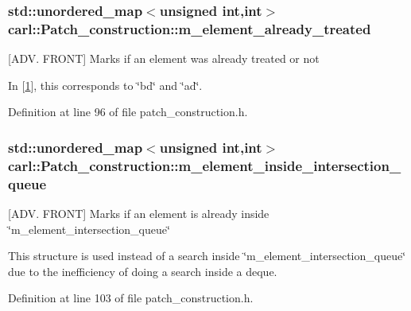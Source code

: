 \subsubsection[{m\+\_\+element\+\_\+already\+\_\+treated}]{\setlength{\rightskip}{0pt plus 5cm}std\+::unordered\+\_\+map$<$unsigned int,int$>$ carl\+::\+Patch\+\_\+construction\+::m\+\_\+element\+\_\+already\+\_\+treated\hspace{0.3cm}{\ttfamily [protected]}}\label{classcarl_1_1_patch__construction_a11aed0d9b1e61d152d02cf56e1690c53}


\mbox{[}A\+D\+V. F\+R\+O\+N\+T\mbox{]} Marks if an element was already treated or not 

In \mbox{[}\hyperlink{classcarl_1_1_patch__construction_Gander_article}{1}\mbox{]}, this corresponds to \char`\"{}bd\char`\"{} and \char`\"{}ad\char`\"{}. 

Definition at line 96 of file patch\+\_\+construction.\+h.

\hypertarget{classcarl_1_1_patch__construction_a66d5ff525192d6aa53ea63beb95afd7d}{}
\subsubsection[{m\+\_\+element\+\_\+inside\+\_\+intersection\+\_\+queue}]{\setlength{\rightskip}{0pt plus 5cm}std\+::unordered\+\_\+map$<$unsigned int,int$>$ carl\+::\+Patch\+\_\+construction\+::m\+\_\+element\+\_\+inside\+\_\+intersection\+\_\+queue\hspace{0.3cm}{\ttfamily [protected]}}\label{classcarl_1_1_patch__construction_a66d5ff525192d6aa53ea63beb95afd7d}


\mbox{[}A\+D\+V. F\+R\+O\+N\+T\mbox{]} Marks if an element is already inside \char`\"{}m\+\_\+element\+\_\+intersection\+\_\+queue\char`\"{} 

This structure is used instead of a search inside \char`\"{}m\+\_\+element\+\_\+intersection\+\_\+queue\char`\"{} due to the inefficiency of doing a search inside a deque. 

Definition at line 103 of file patch\+\_\+construction.\+h.

\hypertarget{classcarl_1_1_patch__construction_afb05a2bad18a8c6fa0287ae44a246687}{}

